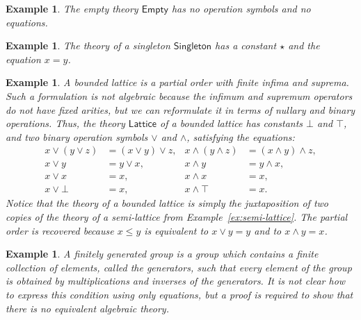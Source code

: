 \documentclass{amsart}
\newcommand{\theory}[1]{\mathsf{#1}} %
\newtheorem{example}[definition]{Example}
\begin{document}
\begin{example}
  \label{ex:theory-empty}
  The \emph{empty theory $\theory{Empty}$} has no operation symbols and no equations.
\end{example}

\begin{example}
  \label{ex:theory-singleton}
  The theory of a \emph{singleton $\theory{Singleton}$} has a constant $\star$ and the
  equation $x = y$.
\end{example}

\begin{example}
  \label{ex:lattice}
  A bounded lattice is a partial order with finite infima and suprema. Such a formulation
  is not algebraic because the infimum and supremum operators do not have fixed arities,
  but we can reformulate it in terms of nullary and binary operations. Thus, the theory
  $\theory{Lattice}$ of a bounded lattice has constants $\bot$ and $\top$, and two binary
  operation symbols $\vee$ and $\wedge$, satisfying the equations:
  \begin{align*}
    x \vee (y \vee z) &= (x \vee y) \vee z,   &      x \wedge (y \wedge z) &= (x \wedge y) \wedge z,\\
    x \vee y &= y \vee x,                     &      x \wedge y &= y \wedge x,\\
    x \vee x &= x,                            &      x \wedge x &= x,\\
    x \vee \bot &= x,                         &      x \wedge \top &= x.
  \end{align*}
  Notice that the theory of a bounded lattice is simply the juxtaposition of two copies of
  the theory of a semi-lattice from Example~\ref{ex:semi-lattice}. The partial order is
  recovered because $x \leq y$ is equivalent to $x \vee y = y$ and to $x \wedge y = x$.
\end{example}

\begin{example}
  \label{ex:finitely-generated-group}
  A \emph{finitely generated group} is a group which contains a finite collection of
  elements, called the \emph{generators}, such that every element of the group is obtained
  by multiplications and inverses of the generators. It is not clear how to express this
  condition using only equations, but a proof is required to show that there is no
  equivalent algebraic theory.
\end{example}
\end{document}
